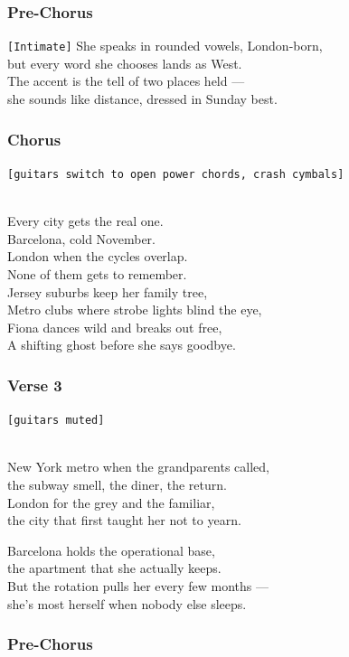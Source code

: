 \documentclass[]{article}
\begin{document}
\subsubsection{Pre-Chorus}\label{pre-chorus-19}

\texttt{{[}Intimate{]}} She speaks in rounded vowels, London-born,\\
but every word she chooses lands as West.\\
The accent is the tell of two places held ---\\
she sounds like distance, dressed in Sunday best.

\subsubsection{Chorus}\label{chorus-34}

\texttt{{[}guitars\ switch\ to\ open\ power\ chords,\ crash\ cymbals{]}}\strut \\
Every city gets the real one.\\
Barcelona, cold November.\\
London when the cycles overlap.\\
None of them gets to remember.\\
Jersey suburbs keep her family tree,\\
Metro clubs where strobe lights blind the eye,\\
Fiona dances wild and breaks out free,\\
A shifting ghost before she says goodbye.

\subsubsection{Verse 3}\label{verse-3-7}

\texttt{{[}guitars\ muted{]}}\strut \\
New York metro when the grandparents called,\\
the subway smell, the diner, the return.\\
London for the grey and the familiar,\\
the city that first taught her not to yearn.

Barcelona holds the operational base,\\
the apartment that she actually keeps.\\
But the rotation pulls her every few months ---\\
she's most herself when nobody else sleeps.

\subsubsection{Pre-Chorus}\label{pre-chorus-20}
\end{document}
